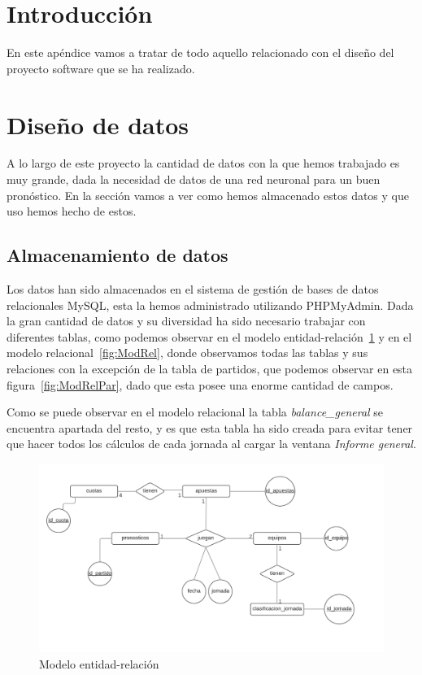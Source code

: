 
\section{Introducción}

En este apéndice vamos a tratar de todo aquello relacionado con el diseño del proyecto software que se ha realizado.

\section{Diseño de datos}

A lo largo de este proyecto la cantidad de datos con la que hemos trabajado es muy grande, dada la necesidad de datos de una red neuronal para un buen pronóstico. En la sección vamos a ver como hemos almacenado estos datos y que uso hemos hecho de estos.

\subsection{Almacenamiento de datos}

Los datos han sido almacenados en el sistema de gestión de bases de datos relacionales MySQL, esta  la hemos administrado utilizando PHPMyAdmin. Dada la gran cantidad de datos y su diversidad ha sido necesario trabajar con diferentes tablas, como podemos observar en el modelo entidad-relación~\ref{fig:EntRel} y en el modelo relacional~\ref{fig:ModRel}, donde observamos todas las tablas y sus relaciones con la excepción de la tabla de partidos, que podemos observar en esta figura~\ref{fig:ModRelPar}, dado que esta posee una enorme cantidad de campos.

Como se puede observar en el modelo relacional la tabla \textit{balance\_general} se encuentra apartada del resto, y es que esta tabla ha sido creada para evitar tener que hacer todos los cálculos de cada jornada al cargar la ventana \textit{Informe general}.

\begin{figure}
\centering
\includegraphics[width=.9\textwidth]{img/diagrama_entidad_relacion}
\caption{Modelo entidad-relación}
\label{fig:EntRel}
\end{figure}

